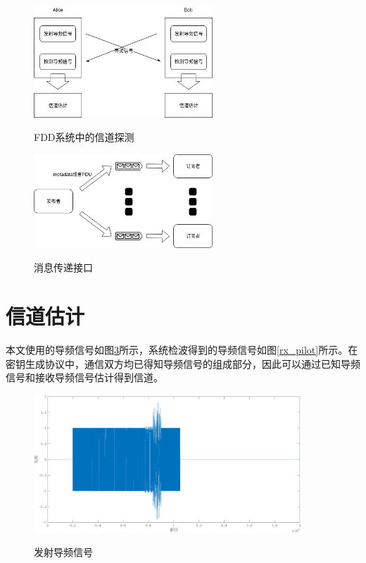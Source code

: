 \begin{figure}[htbp]
  \centering
  \includegraphics[width=0.6\textwidth]{images/two_tranceiver_structure_fdd}
  \caption{FDD系统中的信道探测}{} 
  \label{two_tranceiver_structure_fdd}
\end{figure}

\begin{figure}[htbp]
    \centering
    \includegraphics[width=0.6\textwidth]{images/message_passing}
    \caption{消息传递接口}{} 
    \label{message_passing}
\end{figure}

\section{信道估计}

本文使用的导频信号如图\ref{tx_pilot}所示，系统检波得到的导频信号如图\ref{rx_pilot}所示。在密钥生成协议中，通信双方均已得知导频信号的组成部分，因此可以通过已知导频信号和接收导频信号估计得到信道。

\begin{figure}[htbp]
    \centering
    \includegraphics[width=0.9\textwidth]{images/tx_pilot}
    \caption{发射导频信号}{} 
    \label{tx_pilot}
\end{figure}

